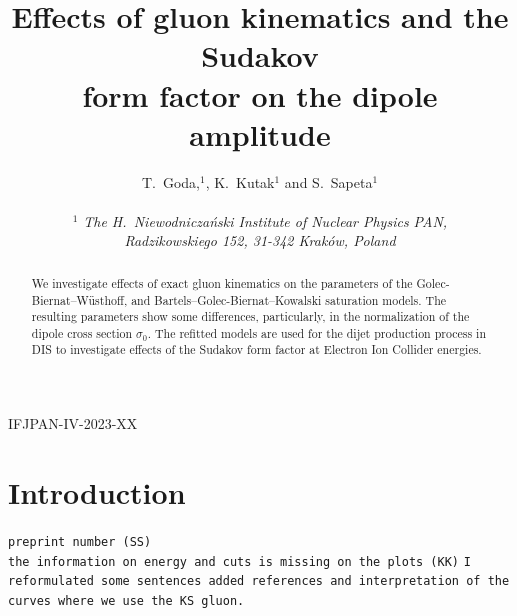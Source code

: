 \documentclass[11pt]{article}
\author{
T.~Goda,$^1$, K.~Kutak$^{1}$ and S.~Sapeta$^1$\\\,\\
$^1$ 
{\small\it The H.\ Niewodnicza\'nski Institute of Nuclear Physics PAN,}\\ 
{\small\it Radzikowskiego 152, 31-342 Krak\'ow, Poland}\\
}
\title{
Effects of gluon kinematics and the Sudakov\\
form factor on the dipole amplitude
}
\date{}
\newcommand{\comment}[1]{\texttt{\color{red}#1}}
\begin{document}
\maketitle

\vspace{-22em}
\begin{flushright}
  IFJPAN-IV-2023-XX
\end{flushright}
\vspace{17.5em}

\begin{abstract}
We investigate effects of exact gluon kinematics on the parameters of the
Golec-Biernat--W\"usthoff, and Bartels--Golec-Biernat--Kowalski saturation
models. The resulting parameters show some differences, particularly, in the
normalization of the dipole cross section $\sigma_0$. The refitted models are
used for the dijet production process in DIS to investigate effects of the
Sudakov form factor at Electron Ion Collider energies.  
\end{abstract}

\section{Introduction}

\comment{preprint number (SS)}\\
\comment{the information on energy and cuts is missing on the plots (KK)}
\comment{I reformulated some sentences added references and  interpretation of the curves where we use the KS gluon.  }
\end{document}
